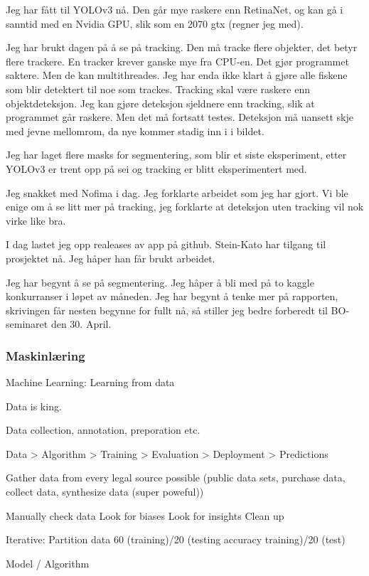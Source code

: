 Jeg har fått til YOLOv3 nå. Den går mye raskere enn RetinaNet, og kan gå i sanntid med en Nvidia GPU, slik som en 2070 gtx (regner jeg med).

Jeg har brukt dagen på å se på tracking. Den må tracke flere objekter, det betyr flere trackere. En tracker krever ganske mye fra CPU-en. Det gjør programmet saktere. Men de kan multithreades. Jeg har enda ikke klart å gjøre alle fiskene som blir detektert til noe som trackes. Tracking skal være raskere enn objektdeteksjon. Jeg kan gjøre deteksjon sjeldnere enn tracking, slik at programmet går raskere. Men det må fortsatt testes. Deteksjon må uansett skje med jevne mellomrom, da nye kommer stadig inn i i bildet.

Jeg har laget flere masks for segmentering, som blir et siste eksperiment, etter YOLOv3 er trent opp på sei og tracking er blitt eksperimentert med.

Jeg snakket med Nofima i dag. Jeg forklarte arbeidet som jeg har gjort. Vi ble enige om å se litt mer på tracking, jeg forklarte at deteksjon uten tracking vil nok virke like bra.

I dag lastet jeg opp realeases av app på github. Stein-Kato har tilgang til prosjektet nå. Jeg håper han får brukt arbeidet.

Jeg har begynt å se på segmentering. Jeg håper å bli med på to kaggle konkurranser i løpet av måneden. Jeg har begynt å tenke mer på rapporten, skrivingen får nesten begynne for fullt nå, så stiller jeg bedre forberedt til BO-seminaret den 30. April.

\subsubsection{Maskinlæring}

Machine Learning: Learning from data

Data is king.

Data collection, annotation, preporation etc.

Data > Algorithm > Training > Evaluation > Deployment > Predictions

	Gather data from every legal source possible (public data sets, purchase data, collect data, synthesize data (super poweful))

	Manually check data
	Look for biases
	Look for insights
	Clean up

	Iterative: Partition data 60 (training)/20 (testing accuracy training)/20 (test)

Model / Algorithm

